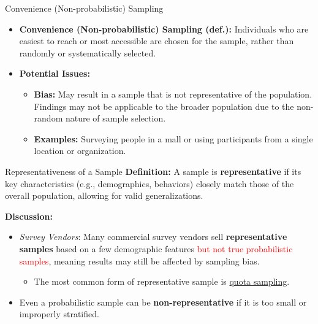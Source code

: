 \documentclass[handout]{beamer} %
\begin{document}
\begin{frame}{Convenience (Non-probabilistic) Sampling}

    \begin{itemize}
        \item \textbf{Convenience (Non-probabilistic) Sampling (def.):} Individuals who are easiest to reach or most accessible are chosen for the sample, rather than randomly or systematically selected.
        \item \textbf{Potential Issues:}
        \begin{itemize}
            \item \textbf{Bias:} May result in a sample that is not representative of the population. Findings may not be applicable to the broader population due to the non-random nature of sample selection.
            \item \textbf{Examples:} Surveying people in a mall or using participants from a single location or organization.
        \end{itemize}
    \end{itemize}
\end{frame}

\begin{frame}{Representativeness of a Sample}
    \textbf{Definition:}
    A sample is \textbf{representative} if its key characteristics (e.g., demographics, behaviors) closely match those of the overall population, allowing for valid generalizations.
    \newline  \pause %

    \textbf{Discussion:}
    \begin{itemize}
        \item \emph{Survey Vendors}:
        Many commercial survey vendors sell \textbf{representative samples} based on a few demographic features
        \textcolor{red}{ but not true probabilistic samples}, meaning results may still be affected by sampling bias.
        \begin{itemize}
            \item The most common form of representative sample is \href{https://dictionary.apa.org/quota-sampling}{quota sampling}.
        \end{itemize}  \pause %
        \item Even a probabilistic sample can be \textbf{non-representative} if it is too small or improperly stratified.
    \end{itemize}

\end{frame}
\end{document}
